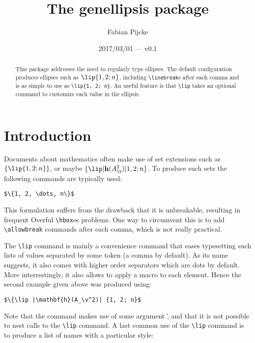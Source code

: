 \documentclass{ltxdoc}
\title{The \textsf{genellipsis} package}
\author{Fabian Pijcke}
\date{2017/03/01 --- v0.1}
\begin{document}
\DeleteShortVerb{\|} %

\maketitle

\begin{abstract}
  This package addresses the need to regularly type ellipses. The default
  configuration produces ellipses such as $\lip{1, 2; n}$, including
  \texttt{\textbackslash linebreak}s after each comma and is as simple to use
  as \texttt{\textbackslash lip\{1, 2; n\}}. An useful feature is that
  \texttt{\textbackslash lip} takes an optional command to customize each value
  in the ellipsis.
\end{abstract}

\section{Introduction}

Documents about mathematics often make use of set extensions such as $\{\lip{1,
2; n}\}$, or maybe $\{\lip |\mathbf{h}(A_\v^2)| {1, 2; n}\}$. To produce such
sets the following commands are typically used:

\begin{verbatim}
$\{1, 2, \dots, n\}$
\end{verbatim}

This formulation suffers from the drawback that it is unbreakable, resulting in
frequent Overful \texttt{\textbackslash hbox}es problems. One way to circumvent
this is to add \texttt{\textbackslash allowbreak} commands after each comma,
which is not really practical.

The \texttt{\textbackslash lip} command is mainly a convenience command that
eases typesetting such lists of values separated by some token (a comma by
default).  As its name suggests, it also comes with higher order separators
which are dots by default.  More interrestingly, it also allows to apply a
macro to each element. Hence the second example given above was produced using:

\begin{verbatim}
$\{\lip |\mathbf{h}(A_\v^2)| {1, 2; n}$
\end{verbatim}

Note that the command makes use of some argument \v, and that it is not
possible to nest calls to the \texttt{\textbackslash lip} command. A last
common use of the \texttt{\textbackslash lip} command is to produce a list of
names with a particular style:
\end{document}
